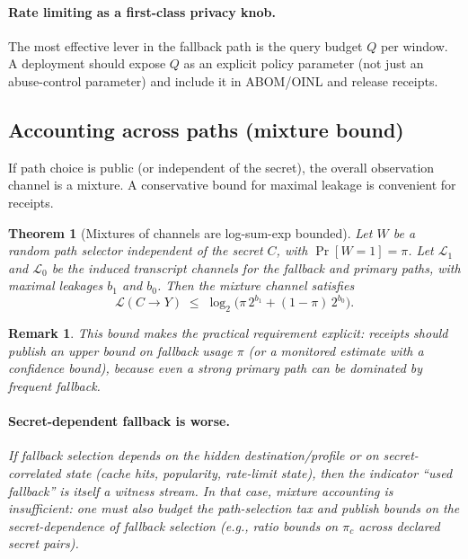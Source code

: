 \documentclass[11pt]{article}
\newtheorem{theorem}{Theorem}
\newtheorem{remark}{Remark}
\newcommand{\MaxL}{\mathcal{L}}
\begin{document}
\paragraph{Rate limiting as a first-class privacy knob.}
The most effective lever in the fallback path is the query budget $Q$ per window.
A deployment should expose $Q$ as an explicit policy parameter (not just an abuse-control parameter) and include it in ABOM/OINL and release receipts.\cite{series:receiptitems,series:abomoinl,series:release}


\subsection{Accounting across paths (mixture bound)}
If path choice is public (or independent of the secret), the overall observation channel is a mixture.
A conservative bound for maximal leakage is convenient for receipts.

\begin{theorem}[Mixtures of channels are log-sum-exp bounded]
Let $W$ be a random path selector independent of the secret $C$, with $\Pr[W=1]=\pi$.
Let $\mathcal{L}_1$ and $\mathcal{L}_0$ be the induced transcript channels for the fallback and primary paths, with maximal leakages $b_1$ and $b_0$.
Then the mixture channel satisfies
\[
\MaxL(C\to Y)\;\le\;\log_2\big(\pi\,2^{b_1} + (1-\pi)\,2^{b_0}\big).
\]
\end{theorem}
\begin{remark}
This bound makes the practical requirement explicit: receipts should publish an upper bound on fallback usage $\pi$ (or a monitored estimate with a confidence bound), because even a strong primary path can be dominated by frequent fallback.

\paragraph{Secret-dependent fallback is worse.}
If fallback selection depends on the hidden destination/profile or on secret-correlated state (cache hits, popularity, rate-limit state), then the indicator ``used fallback'' is itself a witness stream.
In that case, mixture accounting is insufficient: one must also budget the \emph{path-selection tax} and publish bounds on the secret-dependence of fallback selection (e.g., ratio bounds on $\pi_c$ across declared secret pairs).\cite{series:fallbacktax}
\end{remark}
\end{document}

